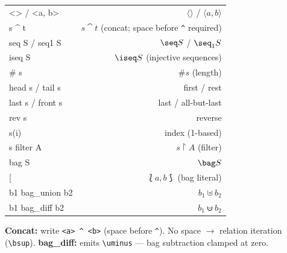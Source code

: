 \documentclass[10pt,landscape,a4paper]{article}
\begin{document}
\begin{multicols}{2}
\begin{tabularx}{\columnwidth}{LR}
<> / <a, b>          & $\langle\rangle$ / $\langle a, b \rangle$ \\
s \textasciicircum{} t  & $s \cat t$ (concat; space before \texttt{\^} required) \\
seq S / seq1 S       & $\seq S$ / $\seq_1 S$ \\
iseq S               & $\iseq S$ (injective sequences) \\
\# s                 & $\# s$ (length) \\
head s / tail s      & first / rest \\
last s / front s     & last / all-but-last \\
rev s                & reverse \\
s(i)                 & index (1-based) \\
s filter A           & $s \upharpoonright A$ (filter) \\
bag S                & $\bag S$ \\
{[}\![a, b]\!{]}     & $\lbag a, b \rbag$ (bag literal) \\
b1 bag\_union b2     & $b_1 \uplus b_2$ \\
b1 bag\_diff b2      & $b_1 \uminus b_2$ \\
\end{tabularx}

{\footnotesize\textbf{Concat:} write \texttt{<a> \^{} <b>} (space before \texttt{\^}).  No space $\to$ relation iteration (\texttt{\textbackslash bsup}). \textbf{bag\_diff:} emits \texttt{\textbackslash uminus} — bag subtraction clamped at zero.}

\end{multicols}

\newpage
\end{document}
